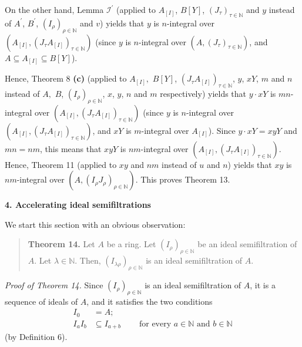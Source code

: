 \documentclass[12pt,final,notitlepage,onecolumn]{article}%
\begin{document}
On the other hand, Lemma $\mathcal{I}^{\prime}$ (applied to $A_{\left[
I\right]  }$, $B\left[  Y\right]  $, $\left(  J_{\tau}\right)  _{\tau
\in\mathbb{N}}$ and $y$ instead of $A^{\prime}$, $B^{\prime}$, $\left(
I_{\rho}\right)  _{\rho\in\mathbb{N}}$ and $v$) yields that $y$ is
$n$-integral over $\left(  A_{\left[  I\right]  },\left(  J_{\tau}A_{\left[
I\right]  }\right)  _{\tau\in\mathbb{N}}\right)  $ (since $y$ is $n$-integral
over $\left(  A,\left(  J_{\tau}\right)  _{\tau\in\mathbb{N}}\right)  $, and
$A\subseteq A_{\left[  I\right]  }\subseteq B\left[  Y\right]  $).

Hence, Theorem 8 \textbf{(c)} (applied to $A_{\left[  I\right]  },$ $B\left[
Y\right]  $, $\left(  J_{\tau}A_{\left[  I\right]  }\right)  _{\tau
\in\mathbb{N}}$, $y$, $xY$, $m$ and $n$ instead of $A,$ $B$, $\left(  I_{\rho
}\right)  _{\rho\in\mathbb{N}}$, $x$, $y$, $n$ and $m$ respectively) yields
that $y\cdot xY$ is $mn$-integral over $\left(  A_{\left[  I\right]  },\left(
J_{\tau}A_{\left[  I\right]  }\right)  _{\tau\in\mathbb{N}}\right)  $ (since
$y$ is $n$-integral over $\left(  A_{\left[  I\right]  },\left(  J_{\tau
}A_{\left[  I\right]  }\right)  _{\tau\in\mathbb{N}}\right)  $, and $xY$ is
$m$-integral over $A_{\left[  I\right]  }$). Since $y\cdot xY=xyY$ and
$mn=nm$, this means that $xyY$ is $nm$-integral over $\left(  A_{\left[
I\right]  },\left(  J_{\tau}A_{\left[  I\right]  }\right)  _{\tau\in
\mathbb{N}}\right)  $. Hence, Theorem 11 (applied to $xy$ and $nm$ instead of
$u$ and $n$) yields that $xy$ is $nm$-integral over $\left(  A,\left(
I_{\rho}J_{\rho}\right)  _{\rho\in\mathbb{N}}\right)  $. This proves Theorem 13.

\begin{center}
\color{blue} \textbf{4. Accelerating ideal semifiltrations} \color{black}
\end{center}

We start this section with an obvious observation:

\begin{quote}
\textbf{Theorem 14.} Let $A$ be a ring. Let $\left(  I_{\rho}\right)
_{\rho\in\mathbb{N}}$ be an ideal semifiltration of $A$. Let $\lambda
\in\mathbb{N}$. Then, $\left(  I_{\lambda\rho}\right)  _{\rho\in\mathbb{N}}$
is an ideal semifiltration of $A$.
\end{quote}

\textit{Proof of Theorem 14.} Since $\left(  I_{\rho}\right)  _{\rho
\in\mathbb{N}}$ is an ideal semifiltration of $A$, it is a sequence of ideals
of $A$, and it satisfies the two conditions%
\begin{align*}
I_{0}  &  =A;\\
I_{a}I_{b}  &  \subseteq I_{a+b}\ \ \ \ \ \ \ \ \ \ \text{for every }%
a\in\mathbb{N}\text{ and }b\in\mathbb{N}%
\end{align*}
(by Definition 6).
\end{document}
